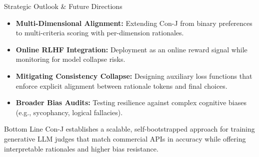 \documentclass[10pt]{beamer}
\begin{document}
\begin{frame}{Strategic Outlook \& Future Directions}
\begin{itemize}
    \item \textbf{Multi-Dimensional Alignment:} Extending Con-J from binary preferences to multi-criteria scoring with per-dimension rationales.
    \item \textbf{Online RLHF Integration:} Deployment as an online reward signal while monitoring for model collapse risks.
    \item \textbf{Mitigating Consistency Collapse:} Designing auxiliary loss functions that enforce explicit alignment between rationale tokens and final choices.
    \item \textbf{Broader Bias Audits:} Testing resilience against complex cognitive biases (e.g., sycophancy, logical fallacies).
\end{itemize}

\vspace{0.4cm}
\begin{alertblock}{Bottom Line}
    Con-J establishes a scalable, self-bootstrapped approach for training generative LLM judges that match commercial APIs in accuracy while offering interpretable rationales and higher bias resistance.
\end{alertblock}
\end{frame}
\end{document}
